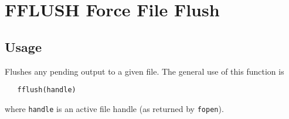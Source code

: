 \section{FFLUSH Force File Flush}

\subsection{Usage}

Flushes any pending output to a given file.  The general use of
this function is
\begin{verbatim}
   fflush(handle)
\end{verbatim}
where \verb|handle| is an active file handle (as returned by \verb|fopen|).
